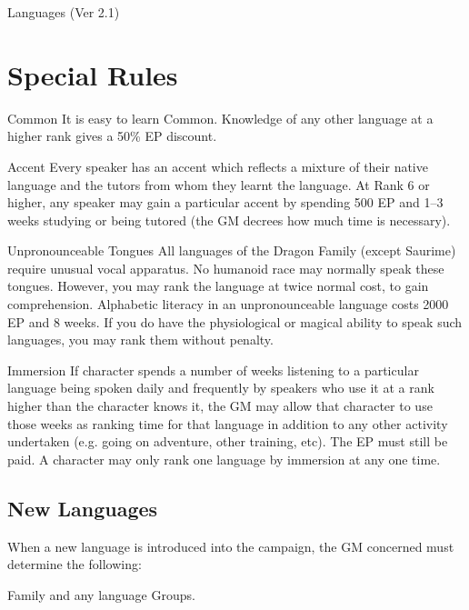 \begin{Chapter}{Languages (Ver 2.1)}
\section{Special Rules}

\begin{Description}

\item[Common] It is easy to learn Common.  Knowledge of any other
  language at a higher rank gives a 50\% EP discount.

\item[Accent] Every speaker has an accent which reflects a mixture of
  their native language and the tutors from whom they learnt the
  language. At Rank 6 or higher, any speaker may gain a particular
  accent by spending 500 EP and 1–3 weeks studying or being tutored
  (the GM decrees how much time is necessary).

\item[Unpronounceable Tongues] All languages of the Dragon Family
  (except Saurime) require unusual vocal apparatus.  No humanoid race
  may normally speak these tongues.  However, you may rank the
  language at twice normal cost, to gain comprehension.  Alphabetic
  literacy in an unpronounceable language costs 2000 EP and 8 weeks.
  If you do have the physiological or magical ability to speak such
  languages, you may rank them without penalty.

\item[Immersion] If character spends a number of weeks listening to a
  particular language being spoken daily and frequently by speakers
  who use it at a rank higher than the character knows it, the GM may
  allow that character to use those weeks as ranking time for that
  language in addition to any other activity undertaken (e.g. going on
  adventure, other training, etc).  The EP must still be paid.  A
  character may only rank one language by immersion at any one time.

\end{Description}

\subsection{New Languages}

When a new language is introduced into the campaign, the GM concerned
must determine the following:

\begin{Itemize}

\item Family and any language Groups. 


\end{Itemize}
\end{Chapter}
